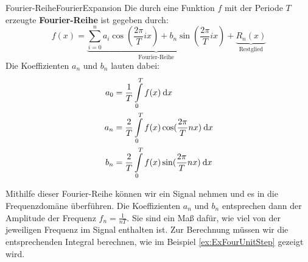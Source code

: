 \begin{definition}{Fourier-Reihe}{FourierExpansion}
    Die durch eine Funktion $f$ mit der Periode $T$ erzeugte \textbf{Fourier-Reihe} ist gegeben durch:
    $$
        f(x) = \underbrace{\sum\limits_{i=0}^n a_i \cos(\frac{2\pi}{T}ix) + b_n \sin(\frac{2\pi}{T}ix)}_{\text{Fourier-Reihe}} + \underbrace{R_n(x)}_{\text{Restglied}}
    $$
    Die Koeffizienten $a_n$ und $b_n$ lauten dabei:
    \begin{alignat*}{1}
        a_0 &= \frac{1}{T} \int\limits_0^{T} f(x) \:\mathrm{d}{x} \\
        a_n &= \frac{2}{T} \int\limits_0^{T} f(x) \cos(\frac{2\pi}{T}nx) \:\mathrm{d}{x} \\
        b_n &= \frac{2}{T} \int\limits_0^{T} f(x) \sin(\frac{2\pi}{T}nx) \:\mathrm{d}{x}
    \end{alignat*}
\end{definition}

Mithilfe dieser Fourier-Reihe können wir ein Signal nehmen und es in die Frequenzdomäne überführen. Die Koeffizienten $a_n$ und $b_n$ entsprechen dann der Amplitude der Frequenz $f_n = \frac{1}{nT}$. Sie sind ein Maß dafür, wie viel von der jeweiligen Frequenz im Signal enthalten ist. Zur Berechnung müssen wir die entsprechenden Integral berechnen, wie im Beispiel \ref{ex:ExFourUnitStep} gezeigt wird.

